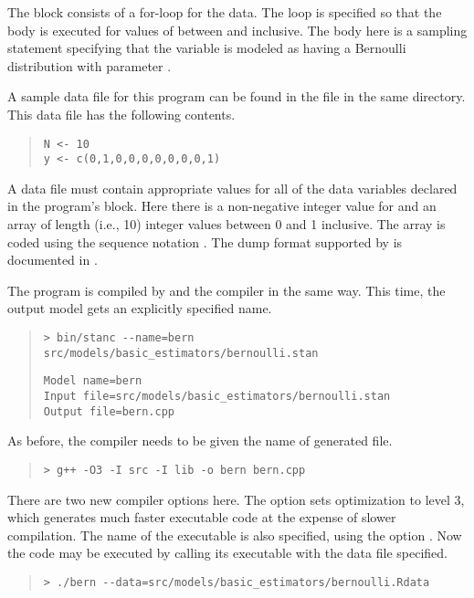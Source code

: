 The  block consists of a for-loop for the data.   The loop is
specified so that the body is executed for values of  between
 and  inclusive.  The body here is a sampling
statement specifying that the variable  is modeled as
having a Bernoulli distribution with parameter .  

A sample data file for this program can be found in the file
 in the same directory.  This data file has
the following contents.
%
\begin{quote}
\begin{Verbatim}
N <- 10
y <- c(0,1,0,0,0,0,0,0,0,1)
\end{Verbatim}
\end{quote}
%
A data file must contain appropriate values for all of the data
variables declared in the \Stan program's  block.  Here there
is a non-negative integer value for  and an array of length
 (i.e., 10) integer values between 0 and 1 inclusive.  The
array is coded using the \SPLUS sequence notation .
The dump format supported by \Stan is documented in .

The program is compiled by \stanc and the \Cpp compiler in the same
way.  This time, the output model gets an explicitly specified name.
%
%
\begin{quote}
\begin{Verbatim}[fontshape=sl]
> bin/stanc --name=bern src/models/basic_estimators/bernoulli.stan 
\end{Verbatim}
\begin{Verbatim}
Model name=bern
Input file=src/models/basic_estimators/bernoulli.stan
Output file=bern.cpp
\end{Verbatim}
\end{quote}
%
As before, the \Cpp compiler needs to be given the name of
generated file.
%
\begin{quote}
\begin{Verbatim}[fontshape=sl]
> g++ -O3 -I src -I lib -o bern bern.cpp
\end{Verbatim}
\end{quote}
%
There are two new compiler options here.  The option  sets
optimization to level 3, which generates much faster executable
code at the expense of slower compilation.  The name of the
executable is also specified, using the option .  Now
the code may be executed by calling its executable with the data file
specified. 
%
\begin{quote}
\begin{Verbatim}[fontshape=sl]
> ./bern --data=src/models/basic_estimators/bernoulli.Rdata
\end{Verbatim}
\end{quote}

